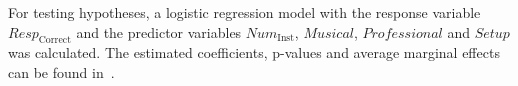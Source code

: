 


For testing hypotheses, a logistic regression model with the response variable $\textit{Resp}_{\mathrm{Correct}}$ and the predictor variables $\textit{Num}_{\mathrm{Inst}}$, $\textit{Musical}$, $\textit{Professional}$ and $\textit{Setup}$ was calculated.
The estimated coefficients, p-values and average marginal effects can be found in~\cite{schoeffler13}.
